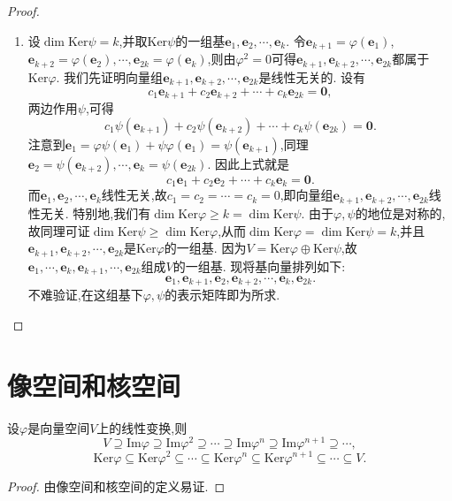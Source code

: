 \documentclass[lang=cn,newtx,10pt,scheme=chinese]{elegantbook}
\begin{document}
\begin{proof}
\begin{enumerate}[(1)]
\item 设\(\dim\text{Ker}\psi=k\),并取\(\text{Ker}\psi\)的一组基\(\boldsymbol{e}_1,\boldsymbol{e}_2,\cdots,\boldsymbol{e}_k\). 令\(\boldsymbol{e}_{k + 1}=\varphi(\boldsymbol{e}_1)\),\(\boldsymbol{e}_{k + 2}=\varphi(\boldsymbol{e}_2),\cdots,\boldsymbol{e}_{2k}=\varphi(\boldsymbol{e}_k)\),则由\(\varphi^2 = 0\)可得\(\boldsymbol{e}_{k + 1},\boldsymbol{e}_{k + 2},\cdots,\boldsymbol{e}_{2k}\)都属于\(\text{Ker}\varphi\). 我们先证明向量组\(\boldsymbol{e}_{k + 1},\boldsymbol{e}_{k + 2},\cdots,\boldsymbol{e}_{2k}\)是线性无关的. 设有
\[
c_1\boldsymbol{e}_{k + 1}+c_2\boldsymbol{e}_{k + 2}+\cdots + c_k\boldsymbol{e}_{2k}=\boldsymbol{0},
\]
两边作用\(\psi\),可得
\[
c_1\psi(\boldsymbol{e}_{k + 1})+c_2\psi(\boldsymbol{e}_{k + 2})+\cdots + c_k\psi(\boldsymbol{e}_{2k})=\boldsymbol{0}.
\]
注意到\(\boldsymbol{e}_1=\varphi\psi(\boldsymbol{e}_1)+\psi\varphi(\boldsymbol{e}_1)=\psi(\boldsymbol{e}_{k + 1})\),同理\(\boldsymbol{e}_2=\psi(\boldsymbol{e}_{k + 2}),\cdots,\boldsymbol{e}_k=\psi(\boldsymbol{e}_{2k})\). 因此上式就是
\[
c_1\boldsymbol{e}_1+c_2\boldsymbol{e}_2+\cdots + c_k\boldsymbol{e}_k=\boldsymbol{0}.
\]
而\(\boldsymbol{e}_1,\boldsymbol{e}_2,\cdots,\boldsymbol{e}_k\)线性无关,故\(c_1 = c_2=\cdots = c_k = 0\),即向量组\(\boldsymbol{e}_{k + 1},\boldsymbol{e}_{k + 2},\cdots,\boldsymbol{e}_{2k}\)线性无关. 特别地,我们有\(\dim\text{Ker}\varphi\geq k=\dim\text{Ker}\psi\). 由于\(\varphi,\psi\)的地位是对称的,故同理可证\(\dim\text{Ker}\psi\geq\dim\text{Ker}\varphi\),从而\(\dim\text{Ker}\varphi=\dim\text{Ker}\psi = k\),并且\(\boldsymbol{e}_{k + 1},\boldsymbol{e}_{k + 2},\cdots,\boldsymbol{e}_{2k}\)是\(\text{Ker}\varphi\)的一组基. 因为\(V=\text{Ker}\varphi\oplus\text{Ker}\psi\),故\(\boldsymbol{e}_1,\cdots,\boldsymbol{e}_k,\boldsymbol{e}_{k + 1},\cdots,\boldsymbol{e}_{2k}\)组成\(V\)的一组基. 现将基向量排列如下:
\[
\boldsymbol{e}_1,\boldsymbol{e}_{k + 1},\boldsymbol{e}_2,\boldsymbol{e}_{k + 2},\cdots,\boldsymbol{e}_k,\boldsymbol{e}_{2k}.
\]
不难验证,在这组基下\(\varphi,\psi\)的表示矩阵即为所求.
\end{enumerate}
\end{proof}

\section{像空间和核空间}

\begin{proposition}\label{proposition:像空间和核空间的子空间链}
设\(\varphi\)是向量空间\(V\)上的线性变换,则
\[
V\supseteq \mathrm{Im}\varphi \supseteq \mathrm{Im}\varphi^2 \supseteq \cdots \supseteq \mathrm{Im}\varphi^n \supseteq \mathrm{Im}\varphi^{n + 1} \supseteq \cdots,
\]
\[
\mathrm{Ker}\varphi \subseteq \mathrm{Ker}\varphi ^2\subseteq \cdots \subseteq \mathrm{Ker}\varphi ^n\subseteq \mathrm{Ker}\varphi ^{n+1}\subseteq \cdots \subseteq V.
\]
\end{proposition}
\begin{proof}
由像空间和核空间的定义易证.
\end{proof}
\end{document}
